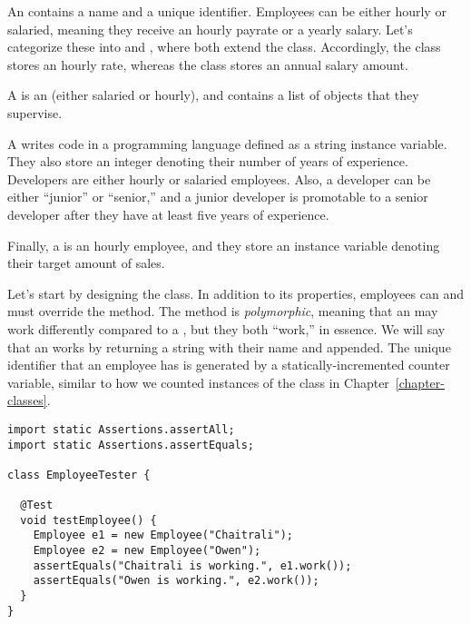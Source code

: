 
An  contains a name and a unique identifier. Employees can be either hourly or salaried, meaning they receive an hourly payrate or a yearly salary. Let's categorize these into  and , where both extend the  class. Accordingly, the  class stores an hourly rate, whereas the  class stores an annual salary amount.

A  is an  (either salaried or hourly), and contains a list of  objects that they supervise. 

A  writes code in a programming language defined as a string instance variable. They also store an integer denoting their number of years of experience. Developers are either hourly or salaried employees. Also, a developer can be either ``junior'' or ``senior,'' and a junior developer is promotable to a senior developer after they have at least five years of experience.

Finally, a  is an hourly employee, and they store an instance variable denoting their target amount of sales.

Let's start by designing the  class. In addition to its properties, employees can  and must override the  method. The  method is \emph{polymorphic}, meaning that an  may work differently compared to a , but they both ``work,'' in essence. We will say that an  works by returning a string with their name and  appended. The unique identifier that an employee has is generated by a statically-incremented counter variable, similar to how we counted instances of the  class in Chapter~\ref{chapter-classes}.

\begin{lstlisting}[language=MyJava]
import static Assertions.assertAll;
import static Assertions.assertEquals;

class EmployeeTester {

  @Test
  void testEmployee() {
    Employee e1 = new Employee("Chaitrali");
    Employee e2 = new Employee("Owen");
    assertEquals("Chaitrali is working.", e1.work());
    assertEquals("Owen is working.", e2.work());
  }
}
\end{lstlisting}

